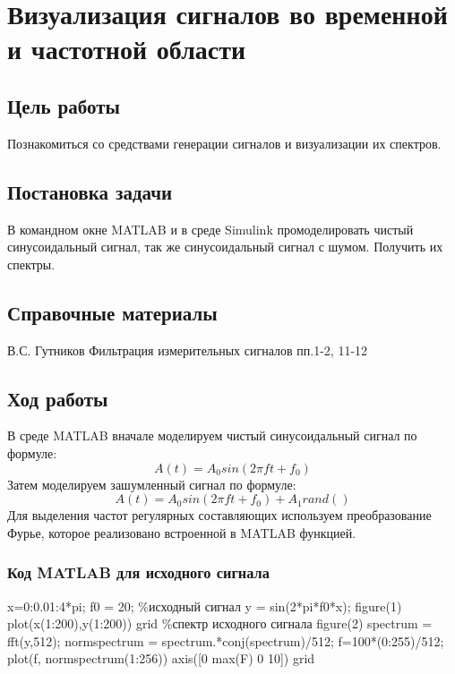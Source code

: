 \documentclass[10pt,a4paper]{article}
\begin{document}
\section{Визуализация сигналов во временной и частотной области}
\subsection{Цель работы}
Познакомиться со средствами генерации сигналов и визуализации их спектров.
\subsection{Постановка задачи}
В командном окне MATLAB и в среде Simulink промоделировать чистый синусоидальный сигнал, так же синусоидальный сигнал с шумом. Получить их спектры.
\subsection{Справочные материалы}
В.С. Гутников Фильтрация измерительных сигналов пп.1-2, 11-12
\subsection{Ход работы}
В среде MATLAB вначале моделируем чистый синусоидальный сигнал по формуле:
\begin{displaymath}
A(t) = A_0sin(2\pi ft + f_0)
\end{displaymath}
Затем моделируем зашумленный сигнал по формуле:
\begin{displaymath}
A(t) = A_0sin(2\pi ft + f_0) + A_1 rand()
\end{displaymath}
Для выделения частот регулярных составляющих используем преобразование Фурье, которое реализовано встроенной в MATLAB функцией.
\subsubsection{Код MATLAB для исходного сигнала}
x=0:0.01:4*pi;\newline
f0 = 20;\newline
\%исходный сигнал\newline
y = sin(2*pi*f0*x);\newline
figure(1)\newline
plot(x(1:200),y(1:200))\newline
grid\newline
\%спектр исходного сигнала\newline
figure(2)\newline
spectrum = fft(y,512);\newline
normspectrum = spectrum.*conj(spectrum)/512;\newline
f=100*(0:255)/512;\newline
plot(f, normspectrum(1:256))\newline
axis([0 max(F) 0 10])\newline
grid\newline
\end{document}
